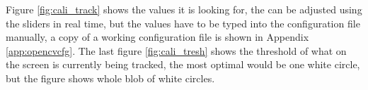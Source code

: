 Figure \ref{fig:cali_track} shows the values it is looking for, the can be adjusted using the sliders in real time, but the values have to be typed into the configuration file manually, a copy of a working configuration file is shown in Appendix \ref{app:opencvcfg}. The last figure \ref{fig:cali_tresh} shows the threshold of what on the screen is currently being tracked, the most optimal would be one white circle, but the figure shows whole blob of white circles.
\begin{figure}
    \centering
    \hfill
    \hfill

\end{figure}
